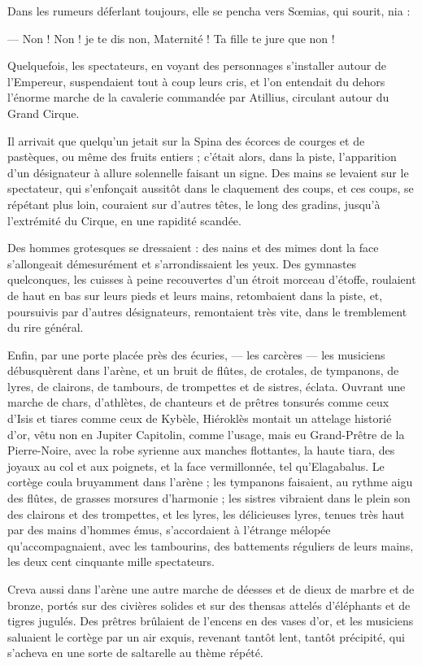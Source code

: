 \documentclass[a4paper, 11pt, oneside, polutonikogreek, french]{article}
\begin{document}
Dans les rumeurs déferlant toujours, elle se pencha vers Sœmias, qui sourit, nia :

--- Non ! Non ! je te dis non, Maternité ! Ta fille te jure que non !

Quelquefois, les spectateurs, en voyant des personnages s'installer autour de l'Empereur, suspendaient tout à coup leurs cris, et l'on entendait du dehors l'énorme marche de la cavalerie commandée par Atillius, circulant autour du Grand Cirque.

Il arrivait que quelqu'un jetait sur la Spina des écorces de courges et de pastèques, ou même des fruits entiers ; c'était alors, dans la piste, l'apparition d'un désignateur à allure solennelle faisant un signe. Des mains se levaient sur le spectateur, qui s'enfonçait aussitôt dans le claquement des coups, et ces coups, se répétant plus loin, couraient sur d'autres têtes, le long des gradins, jusqu'à l'extrémité du Cirque, en une rapidité scandée.

Des hommes grotesques se dressaient : des nains et des mimes dont la face s'allongeait démesurément et s'arrondissaient les yeux. Des gymnastes quelconques, les cuisses à peine recouvertes d'un étroit morceau d'étoffe, roulaient de haut en bas sur leurs pieds et leurs mains, retombaient dans la piste, et, poursuivis par d'autres désignateurs, remontaient très vite, dans le tremblement du rire général.

Enfin, par une porte placée près des écuries, --- les carcères --- les musiciens débusquèrent dans l'arène, et un bruit de flûtes, de crotales, de tympanons, de lyres, de clairons, de tambours, de trompettes et de sistres, éclata. Ouvrant une marche de chars, d'athlètes, de chanteurs et de prêtres tonsurés comme ceux d'Isis et tiares comme ceux de Kybèle, Hiéroklès montait un attelage historié d'or, vêtu non en Jupiter Capitolin, comme l'usage, mais eu Grand-Prêtre de la Pierre-Noire, avec la robe syrienne aux manches flottantes, la haute tiara, des joyaux au col et aux poignets, et la face vermillonnée, tel qu'Elagabalus. Le cortège coula bruyamment dans l'arène ; les tympanons faisaient, au rythme aigu des flûtes, de grasses morsures d'harmonie ; les sistres vibraient dans le plein son des clairons et des trompettes, et les lyres, les délicieuses lyres, tenues très haut par des mains d'hommes émus, s'accordaient à l'étrange mélopée qu'accompagnaient, avec les tambourins, des battements réguliers de leurs mains, les deux cent cinquante mille spectateurs.

Creva aussi dans l'arène une autre marche de déesses et de dieux de marbre et de bronze, portés sur des civières solides et sur des thensas attelés d'éléphants et de tigres jugulés. Des prêtres brûlaient de l'encens en des vases d'or, et les musiciens saluaient le cortège par un air exquis, revenant tantôt lent, tantôt précipité, qui s'acheva en une sorte de saltarelle au thème répété.
\end{document}
